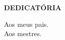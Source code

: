 \vfill
\begin{center}
{\textbf{DEDICATÓRIA}\\}
\end{center}

\noindent Aos meus pais.\\
\noindent Aos mestres.\\


